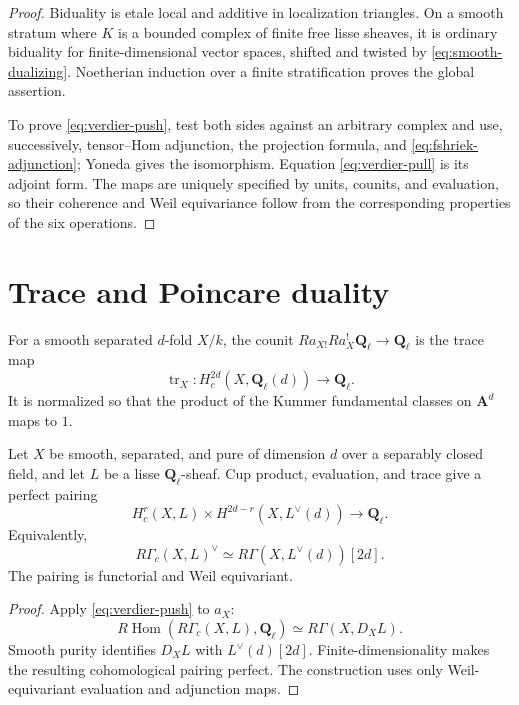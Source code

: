 \begin{proof}
Biduality is etale local and additive in localization triangles.  On a smooth
stratum where \(K\) is a bounded complex of finite free lisse sheaves, it is
ordinary biduality for finite-dimensional vector spaces, shifted and twisted
by \eqref{eq:smooth-dualizing}.  Noetherian induction over a finite
stratification proves the global assertion.

To prove \eqref{eq:verdier-push}, test both sides against an arbitrary complex
and use, successively, tensor--Hom adjunction, the projection formula, and
\eqref{eq:fshriek-adjunction}; Yoneda gives the isomorphism.
Equation \eqref{eq:verdier-pull} is its adjoint form.  The maps are uniquely
specified by units, counits, and evaluation, so their coherence and Weil
equivariance follow from the corresponding properties of the six operations.
\end{proof}

\section{Trace and Poincare duality}

For a smooth separated \(d\)-fold \(X/k\), the counit
\(Ra_{X!}Ra_X^!\mathbf Q_\ell\to\mathbf Q_\ell\) is the trace map
\[
 \operatorname{tr}_X:
 H_c^{2d}(X,\mathbf Q_\ell(d))\longrightarrow\mathbf Q_\ell.
\tag{7.9}\label{eq:trace-map}
\]
It is normalized so that the product of the Kummer fundamental classes on
\(\mathbf A^d\) maps to \(1\).

\begin{theorem}
\label{thm:poincare-duality}
Let \(X\) be smooth, separated, and pure of dimension \(d\) over a separably
closed field, and let \(L\) be a lisse \(\mathbf Q_\ell\)-sheaf.  Cup product,
evaluation, and trace give a perfect pairing
\[
 H_c^r(X,L)\times H^{2d-r}(X,L^\vee(d))
 \longrightarrow\mathbf Q_\ell.
\tag{7.10}\label{eq:poincare-pairing}
\]
Equivalently,
\[
 R\Gamma_c(X,L)^\vee
 \simeq R\Gamma(X,L^\vee(d))[2d].
\tag{7.11}\label{eq:poincare-derived}
\]
The pairing is functorial and Weil equivariant.
\end{theorem}

\begin{proof}
Apply \eqref{eq:verdier-push} to \(a_X\):
\[
 R\operatorname{Hom}(R\Gamma_c(X,L),\mathbf Q_\ell)
 \simeq R\Gamma(X,D_XL).
\]
Smooth purity identifies \(D_XL\) with \(L^\vee(d)[2d]\).
Finite-dimensionality makes the resulting cohomological pairing perfect.
The construction uses only Weil-equivariant evaluation and adjunction maps.
\end{proof}

